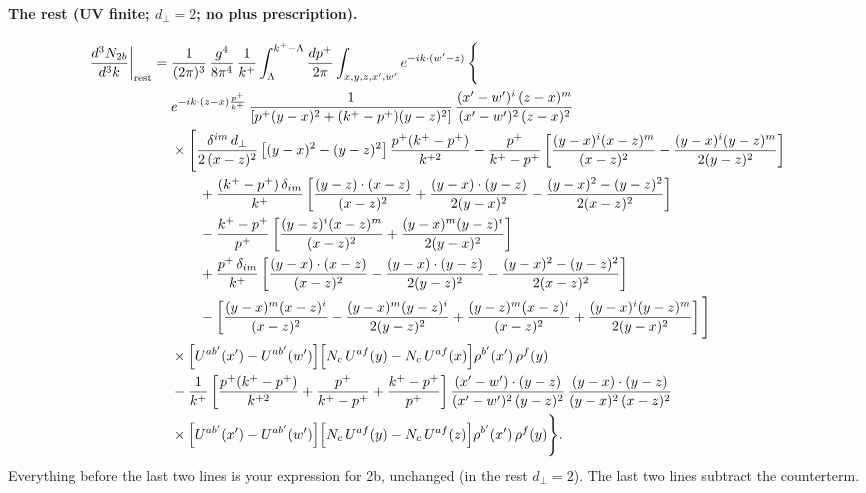 \documentclass[10pt]{article}
\numberwithin{equation}{section}
\begin{document}
\paragraph{The rest (UV finite; $d_\perp=2$; no plus prescription).}
\begin{align}
\frac{d^{3}N_{2b}}{d^{3}k}\bigg|_{\rm rest}={}&\frac{1}{(2\pi)^{3}}\,\frac{g^{4}}{8\pi^{4}}\,\frac{1}{k^{+}}\int_{\Lambda}^{k^{+}-\Lambda}\frac{dp^{+}}{2\pi}\int_{x,y,z,x',w'}e^{-ik\cdot(w'-z)}\,\Bigg\{\notag\\
&e^{-ik\cdot(z-x)\frac{p^{+}}{k^{+}}}\,\frac{1}{\left[p^{+}(y-x)^{2}+(k^{+}-p^{+})(y-z)^{2}\right]}\,\frac{(x'-w')^{i}\,(z-x)^{m}}{(x'-w')^{2}\,(z-x)^{2}}\notag\\
&\times\Bigg[\frac{\delta^{im}\,d_{\perp}}{2\,(x-z)^{2}}\left[(y-x)^{2}-(y-z)^{2}\right]\frac{p^{+}(k^{+}-p^{+})}{k^{+2}}
-\frac{p^{+}}{k^{+}-p^{+}}\left[\frac{(y-x)^{i}(x-z)^{m}}{(x-z)^{2}}-\frac{(y-x)^{i}(y-z)^{m}}{2(y-z)^{2}}\right]\notag\\
&\qquad+\frac{(k^{+}-p^{+})\,\delta_{im}}{k^{+}}\left[\frac{(y-z)\cdot(x-z)}{(x-z)^{2}}+\frac{(y-x)\cdot(y-z)}{2(y-x)^{2}}-\frac{(y-x)^{2}-(y-z)^{2}}{2(x-z)^{2}}\right]\notag\\
&\qquad-\frac{k^{+}-p^{+}}{p^{+}}\left[\frac{(y-z)^{i}(x-z)^{m}}{(x-z)^{2}}+\frac{(y-x)^{m}(y-z)^{i}}{2(y-x)^{2}}\right]\notag\\
&\qquad+\frac{p^{+}\,\delta_{im}}{k^{+}}\left[\frac{(y-x)\cdot(x-z)}{(x-z)^{2}}-\frac{(y-x)\cdot(y-z)}{2(y-z)^{2}}-\frac{(y-x)^{2}-(y-z)^{2}}{2(x-z)^{2}}\right]\notag\\
&\qquad-\left[\frac{(y-x)^{m}(x-z)^{i}}{(x-z)^{2}}-\frac{(y-x)^{m}(y-z)^{i}}{2(y-z)^{2}}+\frac{(y-z)^{m}(x-z)^{i}}{(x-z)^{2}}+\frac{(y-x)^{i}(y-z)^{m}}{2(y-x)^{2}}\right]\Bigg]\notag\\
&\times\Big[U^{ab'}(x')-U^{ab'}(w')\Big]\Big[N_{c}\,U^{af}(y)-N_{c}\,U^{af}(x)\Big]\rho^{b'}(x')\,\rho^{f}(y)\notag\\
&-\frac{1}{k^{+}}\left[\frac{p^{+}(k^{+}-p^{+})}{k^{+2}}+\frac{p^{+}}{k^{+}-p^{+}}+\frac{k^{+}-p^{+}}{p^{+}}\right]
\frac{(x'-w')\cdot(y-z)}{(x'-w')^{2}\,(y-z)^{2}}\,\frac{(y-x)\cdot(y-z)}{(y-x)^{2}\,(x-z)^{2}}\notag\\
&\times\Big[U^{ab'}(x')-U^{ab'}(w')\Big]\Big[N_{c}\,U^{af}(y)-N_{c}\,U^{af}(z)\Big]\rho^{b'}(x')\,\rho^{f}(y)\Bigg\}.
\label{eq:rest}
\end{align}
Everything before the last two lines is your expression for 2b, unchanged (in the rest $d_\perp=2$). The last two lines subtract the counterterm.
\end{document}
